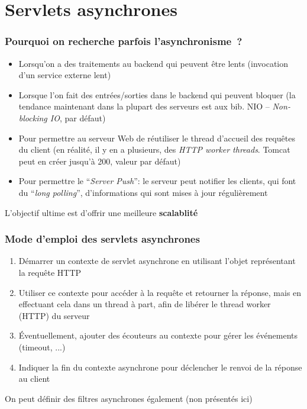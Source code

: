 \documentclass{beamer}
\begin{document}
\section{Servlets asynchrones}
\begin{frame}
	\frametitle{Pourquoi on recherche parfois l'asynchronisme~?}
	\begin{itemize}
		\item Lorsqu'on a des traitements au backend qui peuvent être lents (invocation d'un service externe lent)
		\item Lorsque l'on fait des entrées/sorties dans le backend qui peuvent bloquer (la tendance maintenant dans la plupart des serveurs est aux bib. NIO -- \textit{Non-blocking IO}, par défaut)
		\item Pour permettre au serveur Web de réutiliser le thread d'accueil des requêtes du client (en réalité, il y en a plusieurs, des \textit{HTTP worker threads}. Tomcat peut en créer jusqu'à 200, valeur par défaut)
		\item Pour permettre le ``\textit{Server Push}'': le serveur peut notifier les clients, qui font du ``\textit{long polling}'', d'informations qui sont mises à jour régulièrement
	\end{itemize}
	L'objectif ultime est d'offrir une meilleure \textbf{scalablité}
\end{frame}

\begin{frame}
	\frametitle{Mode d'emploi des servlets asynchrones}
	\begin{enumerate}
		\item Démarrer un contexte de servlet asynchrone en utilisant l'objet représentant la requête HTTP
		\item Utiliser ce contexte pour accéder à la requête et retourner la réponse, mais en effectuant cela dans un thread à part,  afin de libérer le thread worker (HTTP) du serveur
		\item Éventuellement, ajouter des écouteurs au contexte pour gérer les événements (timeout, ...)
		\item Indiquer la fin du contexte asynchrone pour déclencher le renvoi de la réponse au client
	\end{enumerate}
	On peut définir des filtres asynchrones également (non présentés ici)
\end{frame}
\end{document}
